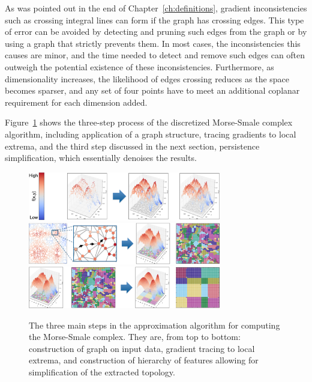 As was pointed out in the end of Chapter~\ref{ch:definitions}, gradient inconsistencies such as crossing integral lines can form if the graph has crossing edges.
%
This type of error can be avoided by detecting and pruning such edges from the graph or by using a graph that strictly prevents them.
%
In most cases, the inconsistencies this causes are minor, and the time needed to detect and remove such edges can often outweigh the potential existence of these inconsistencies.
%
Furthermore, as dimensionality increases, the likelihood of edges crossing reduces as the space becomes sparser, and any set of four points have to meet an additional coplanar requirement for each dimension added.
%

Figure~\ref{fig:mscAlgorithm} shows the three-step process of the discretized Morse-Smale complex algorithm, including application of a graph structure, tracing gradients to local extrema, and the third step discussed in the next section, persistence simplification, which essentially denoises the results.

\begin{figure}[b]
  \centering
  \includegraphics[width=0.75\textwidth]{figs/chap4/amscStep1}
  \includegraphics[width=0.75\textwidth]{figs/chap4/amscStep2}
  \includegraphics[width=0.75\textwidth]{figs/chap4/amscStep3}
  \caption[Illustration of the Morse-Smale approximation for unstructured data]{The three main steps in the approximation algorithm for computing the Morse-Smale complex. They are, from top to bottom: construction of graph on input data, gradient tracing to local extrema, and construction of hierarchy of features allowing for simplification of the extracted topology.}
  \label{fig:mscAlgorithm}
\end{figure}

